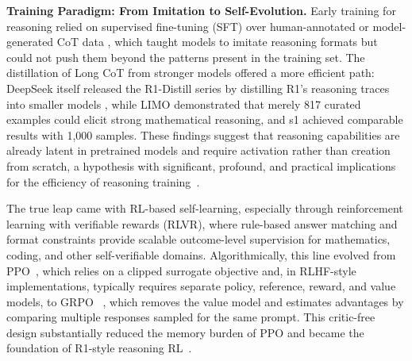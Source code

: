\textbf{Training Paradigm: From Imitation to Self-Evolution.} Early training for reasoning relied on supervised fine-tuning (SFT) over human-annotated or model-generated CoT data \cite{cobbe2021gsm8k}, which taught models to imitate reasoning formats but could not push them beyond the patterns present in the training set. The distillation of Long CoT from stronger models offered a more efficient path: DeepSeek itself released the R1-Distill series by distilling R1's reasoning traces into smaller models \cite{deepseek2025r1}, while LIMO \cite{ye2025limo} demonstrated that merely 817 curated examples could elicit strong mathematical reasoning, and s1 \cite{muennighoff2025s1} achieved comparable results with 1,000 samples. These findings suggest that reasoning capabilities are already latent in pretrained models and require activation rather than creation from scratch, a hypothesis with significant, profound, and practical implications for the efficiency of reasoning training~\citep{dai2024beyond,luo2025deconstructing,gao2025towards,feng2025efficient,zhang2026reinforcement}.

The true leap came with RL-based self-learning, especially through reinforcement learning with verifiable rewards (RLVR), where rule-based answer matching and format constraints provide scalable outcome-level supervision for mathematics, coding, and other self-verifiable domains. Algorithmically, this line evolved from PPO~\cite{schulman2017proximal}, which relies on a clipped surrogate objective and, in RLHF-style implementations, typically requires separate policy, reference, reward, and value models, to GRPO ~\cite{shao2024deepseekmath}, which removes the value model and estimates advantages by comparing multiple responses sampled for the same prompt. This critic-free design substantially reduced the memory burden of PPO and became the foundation of R1-style reasoning RL~\citep{wang2025efficient,yeo2025demystifying,li2023mixed,cetin2026reinforcement,shridhar2023distilling}.

